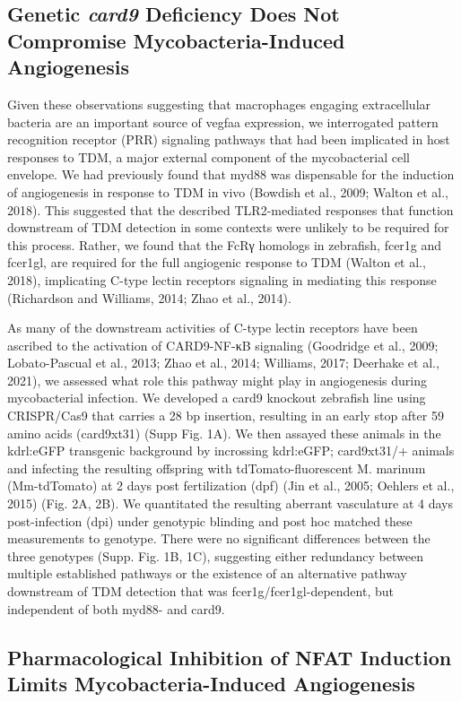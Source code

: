 \subsection{Genetic \textit{card9} Deficiency Does Not Compromise Mycobacteria-Induced Angiogenesis}

Given these observations suggesting that macrophages engaging extracellular bacteria are an important source of vegfaa expression, we interrogated pattern recognition receptor (PRR) signaling pathways that had been implicated in host responses to TDM, a major external component of the mycobacterial cell envelope. We had previously found that myd88 was dispensable for the induction of angiogenesis in response to TDM in vivo (Bowdish et al., 2009; Walton et al., 2018). This suggested that the described TLR2-mediated responses that function downstream of TDM detection in some contexts were unlikely to be required for this process. Rather, we found that the FcRγ homologs in zebrafish, fcer1g and fcer1gl, are required for the full angiogenic response to TDM (Walton et al., 2018), implicating C-type lectin receptors signaling in mediating this response (Richardson and Williams, 2014; Zhao et al., 2014).

As many of the downstream activities of C-type lectin receptors have been ascribed to the activation of CARD9-NF-κB signaling (Goodridge et al., 2009; Lobato-Pascual et al., 2013; Zhao et al., 2014; Williams, 2017; Deerhake et al., 2021), we assessed what role this pathway might play in angiogenesis during mycobacterial infection. We developed a card9 knockout zebrafish line using CRISPR/Cas9 that carries a 28 bp insertion, resulting in an early stop after 59 amino acids (card9xt31) (Supp Fig. 1A). We then assayed these animals in the kdrl:eGFP transgenic background by incrossing kdrl:eGFP; card9xt31/+ animals and infecting the resulting offspring with tdTomato-fluorescent M. marinum (Mm-tdTomato) at 2 days post fertilization (dpf) (Jin et al., 2005; Oehlers et al., 2015) (Fig. 2A, 2B). We quantitated the resulting aberrant vasculature at 4 days post-infection (dpi) under genotypic blinding and post hoc matched these measurements to genotype. There were no significant differences between the three genotypes (Supp. Fig. 1B, 1C), suggesting either redundancy between multiple established pathways or the existence of an alternative pathway downstream of TDM detection that was fcer1g/fcer1gl-dependent, but independent of both myd88- and card9. 

\subsection{Pharmacological Inhibition of NFAT Induction Limits Mycobacteria-Induced Angiogenesis}

